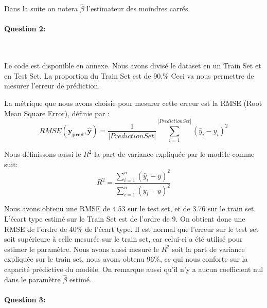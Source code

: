 \documentclass{article}
\begin{document}
	
	Dans la suite on notera $\hat{\beta}$ l'estimateur des moindres carrés.
	
	\paragraph{Question 2:}
	~\par
	
	Le code est disponible en annexe. Nous avons divisé le dataset en un Train Set et en Test Set. La proportion du Train Set est de 90.\%
	Ceci va nous permettre de mesurer l'erreur de prédiction.
	
	La métrique que nous avons choisie pour mesurer cette erreur est la RMSE (Root Mean Square Error), définie par :
	\begin{equation}
	RMSE(\textbf{y}_{\textbf{pred}}, \hat{\textbf{y}})= \frac{1}{|Prediction Set|}\sum_{i=1}^{|Prediction Set|}{(\hat{y}_{i} - y_{i})^2}
	\end{equation}
	
	Nous définissons aussi le $R^2$ la part de variance expliquée par le modèle comme suit:
	\begin{equation}
	R^2 = \frac{\sum_{i=1}^{n}(\hat{y}_{i} - \bar{y})^2}{\sum_{i=1}^{n}(y_{i} - \bar{y})^2}
	\end{equation}
	
	Nous avons obtenu une RMSE de 4.53 sur le test set, et de 3.76 sur le train set. L'écart type estimé sur le Train Set est de l'ordre de 9. On obtient donc une RMSE de l'ordre de 40\% de l'écart type. Il est normal que l'erreur sur le test set soit supérieure à celle mesurée sur le train set, car celui-ci a été utilisé pour estimer le paramètre. Nous avons aussi mesuré le $R^2$ soit la part de variance expliquée sur le train set, nous avons obtenu 96\%, ce qui nous conforte sur la capacité prédictive du modèle. On remarque aussi qu'il n'y a aucun coefficient nul dans le paramètre $\hat{\beta}$ estimé.

	
	\paragraph{Question 3:}
	~\par
	
\end{document}
